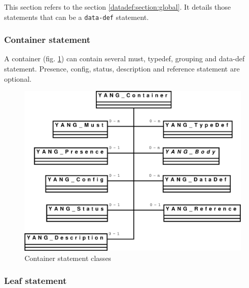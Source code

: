 \documentclass[a4paper]{article}
\begin{document}
This  section refers to  the section  \ref{datadef:section:global}. It
details those statements that can be a {\tt data-def} statement.

\subsubsection{Container statement}

A  container  (fig.  \ref{container})  can  contain  several  must,
typedef,  grouping and data-def  statement. Presence,  config, status,
description and reference statement are optional.
\begin{figure}[htbp]
\begin{center}
\includegraphics[scale = .3]{container.eps}
\end{center}
\caption{Container statement classes}
\label{container}
\end{figure}

\subsubsection{Leaf statement}
\end{document}
